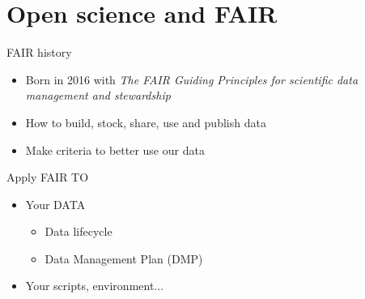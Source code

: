 \section{Open science and FAIR}

\begin{frame}
\begin{block}{FAIR history}
\begin{itemize}
\item Born in 2016 with \textit{The FAIR Guiding Principles for scientific data management and stewardship}
\item How to build, stock, share, use and publish data
\item Make criteria to better use our data
\end{itemize}
\end{block}
\end{frame}

\begin{frame}
\end{frame}

\begin{frame}
\begin{block}{Apply FAIR TO}
\begin{itemize}
\item Your DATA
	\begin{itemize}
	\item Data lifecycle
	\item Data Management Plan (DMP)
	\end{itemize}
\item Your scripts, environment...
\end{itemize}
\end{block}
\end{frame}


